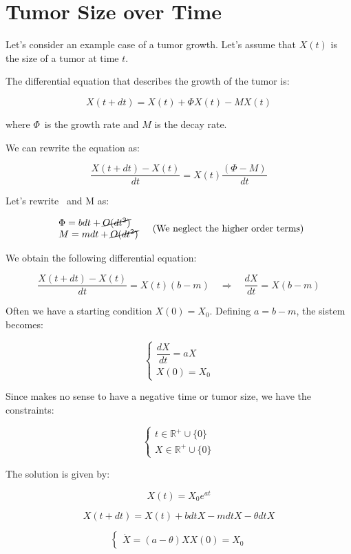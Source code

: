 \newpage

\section{Tumor Size over Time}

Let's consider an example case of a tumor growth. Let's assume that $X(t)$ is the size of a tumor at time $t$.

The differential equation that describes the growth of the tumor is:

$$
X(t + dt) = X(t) + \Phi X(t) - M X(t)
$$

where $\Phi$\ is the growth rate and $M$ is the decay rate.

We can rewrite the equation as:

$$
\dfrac{X(t + dt) - X(t)}{dt} = X(t) \dfrac{(\Phi - M)}{dt}
$$

Let's rewrite \Phi\ and M as:

$$
\begin{array}{l}
\Phi = b dt + \cancel{O(dt^2)} \\
M = m dt + \cancel{O(dt^2)}
\end{array} \quad \text{(We neglect the higher order terms)}
$$

We obtain the following differential equation:

$$
\dfrac{X(t + dt) - X(t)}{dt} = X(t) (b - m) \quad \Rightarrow \quad \dfrac{dX}{dt} = X(b - m)
$$

Often we have a starting condition $X(0) = X_0$. Defining $a = b - m$, the sistem becomes:

$$
\begin{cases}
    \dfrac{dX}{dt} = aX \\
    X(0) = X_0
\end{cases}
$$

Since makes no sense to have a negative time or tumor size, we have the constraints:

$$
\begin{cases}
    t \in \mathbb{R}^+ \cup \{0\} \\
    X \in \mathbb{R}^+ \cup \{0\}
\end{cases}
$$

The solution is given by:

$$
X(t) = X_0 e^{at}
$$

$$
X(t + dt) = X(t) + b dt X - mdt X - \theta dt X
$$

$$
\begin{cases}
\dot X = (a - \theta) X
X(0) = X_0
\end{cases}
$$

